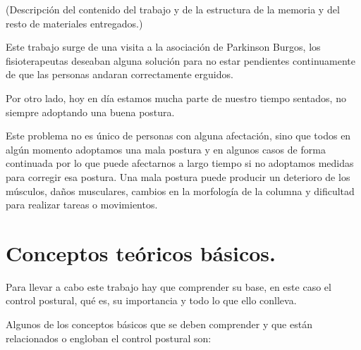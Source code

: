 
(Descripción del contenido del trabajo y de la estructura de la memoria y del resto de materiales entregados.)

Este trabajo surge de una visita a la asociación de Parkinson Burgos, los fisioterapeutas deseaban alguna solución para no estar pendientes continuamente de que las personas andaran correctamente erguidos. 

Por otro lado, hoy en día estamos mucha parte de nuestro tiempo sentados, no siempre adoptando una buena postura.

Este problema no es único de personas con alguna afectación, sino que todos en algún momento adoptamos una mala postura y en algunos casos de forma continuada por lo que puede afectarnos a largo tiempo si no adoptamos medidas para corregir esa postura. Una mala postura puede producir un deterioro de los músculos, daños musculares, cambios en la morfología de la columna y dificultad para realizar tareas o movimientos.


\section{Conceptos teóricos básicos.} %
Para llevar a cabo este trabajo hay que comprender su base, en este caso el control postural, qué es, su importancia y todo lo que ello conlleva.\cite{Libro1,Libro2} %



Algunos de los conceptos básicos que se deben comprender y que están relacionados o engloban el control postural son:

